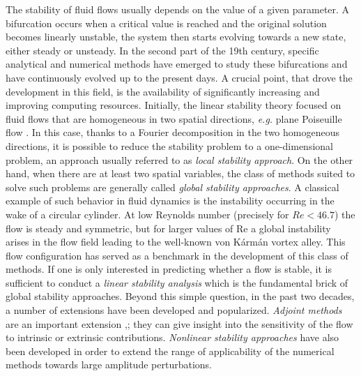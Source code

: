 \documentclass[twocolumn,10pt]{asme2ej}
\begin{document}
The stability of fluid flows usually depends on the value of a given parameter.
A bifurcation occurs when a critical value is reached and the original solution becomes linearly unstable, the system then starts evolving towards a new state, either steady or unsteady. 
In the second part of the 19th century, specific analytical and numerical methods have emerged to study these bifurcations and have continuously evolved up to the present days. 
A crucial point, that drove the development in this field, is the availability of significantly increasing and improving computing resources. 
Initially, the linear stability theory focused on fluid flows that are homogeneous in two spatial directions, \textit{e.g.} plane Poiseuille flow \cite{Dreid2004}. In this case, thanks to a Fourier decomposition in the two homogeneous directions, it is possible to reduce the stability problem to a one-dimensional problem, an approach usually referred to as {\em local stability approach}.
On the other hand,  when there are at least two spatial variables, the class of methods suited to solve such problems are generally called {\em global stability approaches}.
A classical example of such behavior in fluid dynamics is the instability occurring in the wake of a circular cylinder. At low Reynolds number (precisely for $Re < 46.7$) the flow is steady and symmetric, but for larger values of Re a global instability arises in the flow field leading to the well-known von K\'arm\'an vortex alley. 
This flow configuration has served as a benchmark in the development of this class of methods.  
If one is only interested in predicting whether a flow is stable, it is sufficient to conduct a {\em linear stability analysis} which is the fundamental brick of global stability approaches. 
Beyond this simple question, in the past two decades, a number of extensions have been developed and popularized.
{\em Adjoint methods} are an important extension \cite{GiannettiLuchini},\cite{Marquet}; they can give insight into the sensitivity of the flow to intrinsic or extrinsic contributions. 
{\em Nonlinear stability approaches} \cite{SippLebedev} \cite{MLugo2014} have also been developed in order to extend the range of applicability of the numerical methods towards large amplitude perturbations.
\end{document}
